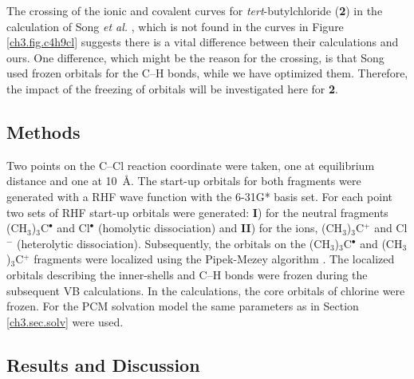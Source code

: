 The crossing of the ionic and covalent curves for \textit{tert}-butylchloride (\textbf{2}) in the calculation of Song \textit{et al.} \cite{song}, which is not found in the curves in Figure \ref{ch3.fig.c4h9cl} suggests there is a vital difference between their calculations and ours. One difference, which might be the reason for the crossing, is that Song used frozen orbitals for the C--H bonds, while we have optimized them. Therefore, the impact of the freezing of orbitals will be investigated here for \textbf{2}.

 \subsection{Methods}

Two points on the C--Cl reaction coordinate were taken, one at equilibrium distance and one at \mbox{10 \AA}. The start-up orbitals for both fragments were generated with a RHF wave function with the 6-31G* basis set. For each point two sets of RHF start-up orbitals were generated: \textbf{I}) for the neutral fragments (CH$_3$)$_3$C$^\bullet$ and Cl$^\bullet$ (homolytic dissociation) and \textbf{II}) for the ions, (CH$_3$)$_3$C$^{+}$ and Cl$^{-}$ (heterolytic dissociation). Subsequently, the orbitals on the (CH$_3$)$_3$C$^\bullet$ and (CH$_3$)$_3$C$^{+}$ fragments were localized using the Pipek-Mezey algorithm \cite{pipek}. The localized orbitals describing the inner-shells and C--H bonds were frozen during the subsequent VB calculations. In the calculations, the core orbitals of chlorine were frozen.  For the PCM solvation model the same parameters as in Section \ref{ch3.sec.solv} were used.

\subsection{\label{ch3.sec.res.freez}Results and Discussion}

